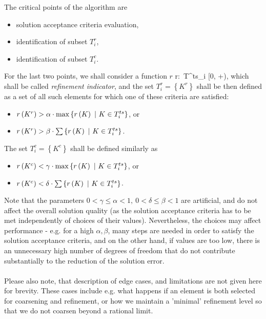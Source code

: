 The critical points of the algorithm are
\begin{itemize}
\item solution acceptance criteria evaluation,
\item identification of subset $T^{r}_i$,
\item identification of subset $T^{c}_i$.
\end{itemize}
For the last two points, we shall consider a function $r$
\be
\label{refinementIndicator}
r:\ T^{ts}_i \rightarrow [0, +\infty),
\ee
which shall be called \textit{refinement indicator}, and the set $T^{r}_i = \left\{K^{r}\right\}$ shall be then defined as a set of all such elements for which one of these criteria are satisfied:
\begin{itemize}
	\item $r\left( K^{r}\right) > \alpha \cdot \max\left\{r\left( K\right)\ |\ K \in T^{ts}_i\right\}$, or
	\item $r\left( K^{r}\right) > \beta \cdot \sum\left\{r\left( K\right)\ |\ K \in T^{ts}_i\right\}$.
\end{itemize}

The set $T^{c}_i = \left\{K^{c}\right\}$ shall be defined similarly as
\begin{itemize}
	\item $r\left( K^{c}\right) < \gamma \cdot \max\left\{r\left( K\right)\ |\ K \in T^{ts}_i\right\}$, or
	\item $r\left( K^{c}\right) < \delta \cdot \sum\left\{r\left( K\right)\ |\ K \in T^{ts}_i\right\}$.
\end{itemize}

Note that the parameters $0 < \gamma \leq \alpha < 1,\ 0 < \delta \leq \beta < 1$ are artificial, and do not affect the overall solution quality (as the solution acceptance criteria has to be met independently of choices of their values). Nevertheless, the choices may affect performance - e.g. for a high $\alpha, \beta$, many steps are needed in order to satisfy the solution acceptance criteria, and on the other hand, if values are too low, there is an unnecessary high number of degrees of freedom that do not contribute substantially to the reduction of the solution error.
\paragraph{}
Please also note, that description of edge cases, and limitations are not given here for brevity. These cases include e.g. what happens if an element is both selected for coarsening and refinement, or how we maintain a 'minimal' refinement level so that we do not coarsen beyond a rational limit.
